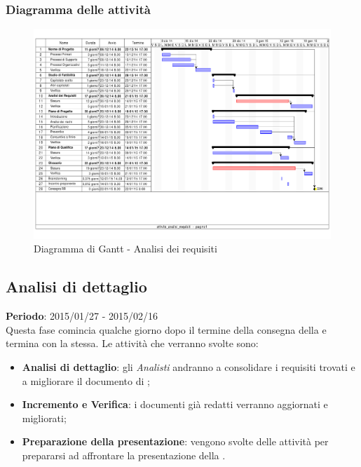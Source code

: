 		\subsubsection{Diagramma delle attività} %
		\label{ssub:diagramma_delle_attivita}
			\begin{figure}[htbp]
				\centering
				\centerline{\includegraphics[scale=0.7]{images/d_attivita_analisi_requisiti.pdf}}
				\caption{Diagramma di Gantt - Analisi dei requisiti}
				\label{fig:gantt_analisi_requisiti}				
			\end{figure}
	
	
	\subsection{Analisi di dettaglio} %
	\label{sub:analisi_di_dettaglio}
	\textbf{Periodo}: 2015/01/27 - 2015/02/16 \\
	Questa fase comincia qualche giorno dopo il termine della consegna della \RR{} e termina con la \RR{} stessa.
	Le attività che verranno svolte sono:
		\begin{itemize}
			\item \textbf{Analisi di dettaglio}: gli \emph{Analisti} andranno a consolidare i requisiti trovati e a migliorare il documento di \docNameVersionAdR;
			\item \textbf{Incremento e Verifica}: i documenti già redatti verranno aggiornati e migliorati;
			\item \textbf{Preparazione della presentazione}: vengono svolte delle attività per prepararsi ad affrontare la presentazione della \RR.
		\end{itemize}
	
